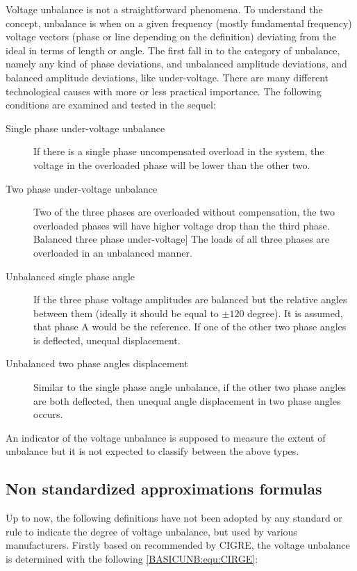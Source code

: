         Voltage unbalance is not a straightforward phenomena. To understand the concept, unbalance is when on a given frequency (mostly fundamental frequency) voltage vectors (phase or line depending on the definition) deviating from the ideal in terms of length or angle. The first fall in to the category of unbalance, namely any kind of phase deviations, and unbalanced amplitude deviations, and balanced amplitude deviations, like under-voltage. There are many different technological causes with more or less practical importance. The following conditions are examined and tested in the sequel:
        \begin{description}
        \item[Single phase under-voltage unbalance]  If there is a single phase uncompensated overload in the system, the voltage in the overloaded phase will be lower than the other two.
        \item[Two phase under-voltage unbalance]  Two of the three phases are overloaded without compensation, the two overloaded phases will have higher voltage drop than the third phase.
        Balanced three phase under-voltage]  The loads of all three phases are overloaded in an unbalanced manner.
        \item[Unbalanced single phase angle]  If the three phase voltage amplitudes are balanced but the relative angles between them (ideally it should be equal to $\pm120$ degree). It is assumed, that phase A would be the reference. If one of the other two phase angles is deflected, unequal displacement.
        \item[Unbalanced two phase angles displacement] Similar to the single phase angle unbalance, if the other two phase angles are both deflected, then unequal angle displacement in two phase angles occurs.
        \end{description}
        An indicator of the voltage unbalance is supposed to measure the extent of unbalance but it is not expected to classify between the above types.
	
	\subsection{Non standardized approximations formulas}
	
	Up to now, the following definitions have not been adopted by any standard or rule to indicate the degree of voltage unbalance, but used by various manufacturers. Firstly based on \cite{eugene1986new} recommended by CIGRE, the voltage unbalance is determined with the following \ref{BASICUNB:equ:CIRGE}:
	
